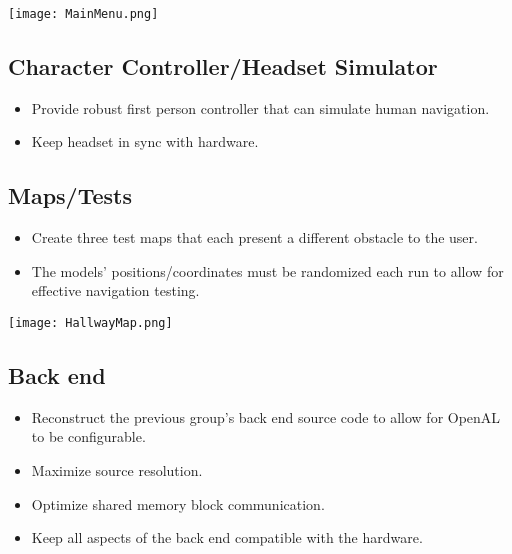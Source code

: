 \documentclass{scrreprt}
\begin{document}
\texttt{[image: MainMenu.png]}\\



\subsection{Character Controller/Headset Simulator}

\begin{itemize}
  \item  Provide robust first person controller that can simulate human navigation.
  \item Keep headset in sync with hardware.
\end{itemize}

\subsection{Maps/Tests}

\begin{itemize}
  \item  Create three test maps that each present a different obstacle to the user.
  \item The models' positions/coordinates must be randomized each run to allow for effective navigation testing.
\end{itemize}


\texttt{[image: HallwayMap.png]}\\



\subsection{Back end}

\begin{itemize}
  \item  Reconstruct the previous group's back end source code to allow for OpenAL to be configurable.
  \item Maximize source resolution.
  \item Optimize shared memory block communication.
  \item Keep all aspects of the back end compatible with the hardware.
  
\end{itemize}
\end{document}

